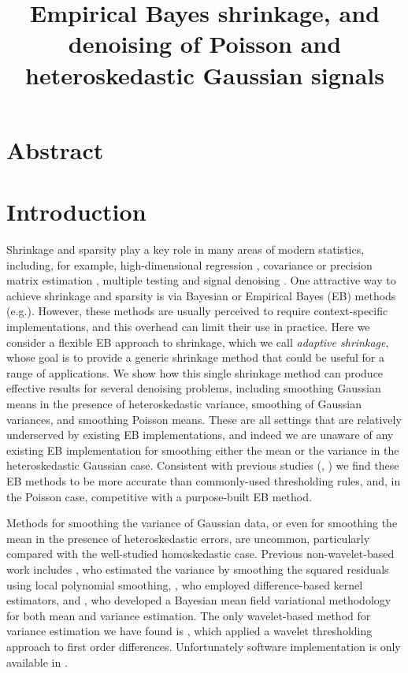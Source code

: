 \documentclass[12pt]{article}
\begin{document}
\title{\textbf{Empirical Bayes shrinkage, and denoising of Poisson and heteroskedastic Gaussian signals}}
\date{}
\maketitle

\section{Abstract}

\section{Introduction}

Shrinkage and sparsity play a key role in many areas of modern statistics, including, for example, high-dimensional regression \cite{Tibshirani1996Regression}, covariance or precision matrix estimation \cite{Bickel2008Covariance}, multiple testing \cite{efron:xx} and signal denoising \cite{Donoho1994Ideal, donoho95}. One attractive way to achieve shrinkage and sparsity is via Bayesian or Empirical Bayes (EB) methods (e.g.\cite{efron?, Johnstone2005Empirical, Clyde2000Flexible,george.mccullogh,bayesian-covariance-estimation}).  
However, these methods are usually perceived to require context-specific implementations, and this overhead can limit their use in practice. Here we consider a flexible EB approach to shrinkage, which we call {\it adaptive shrinkage}, whose goal is to provide a generic shrinkage method that could be useful for a range of applications. 
We show how this single shrinkage method can produce effective results for several denoising problems, including smoothing Gaussian means in the presence of heteroskedastic variance, smoothing of Gaussian variances, and smoothing Poisson means. These are all settings that are relatively underserved by existing EB implementations, and indeed  we are unaware of any existing EB implementation for smoothing either the mean or the variance in the heteroskedastic Gaussian case.
Consistent with previous studies (\cite{Antoniadis2001Wavelet}, \cite{Besbeas2004Comparative}) we find these EB methods to be more accurate than commonly-used thresholding rules, and, in the Poisson case, competitive with a purpose-built EB method. 

Methods for smoothing the variance of Gaussian data, or even for smoothing the mean in the presence of heteroskedastic errors, are uncommon, particularly compared with the well-studied homoskedastic case. Previous non-wavelet-based work includes \cite{Fan1998Efficient}, who estimated the variance by smoothing the squared residuals using local polynomial smoothing, \cite{Brown2007Variance}, who employed difference-based kernel estimators, and \cite{Menictas2015Variational}, who developed a Bayesian mean field variational methodology for both mean and variance estimation. The only wavelet-based method for variance estimation we have found is \cite{Cai2008Adaptive}, which applied a wavelet thresholding approach to first order differences. Unfortunately software implementation is only available in \cite{Menictas2015Variational}.
\end{document}
